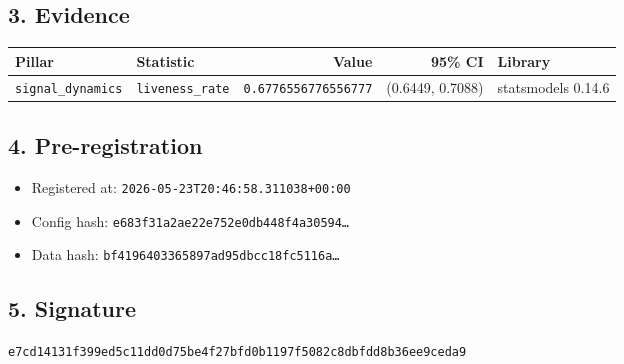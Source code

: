 \documentclass{article}
\begin{document}
\subsection*{3. Evidence}
\begin{tabular}{llrrl}\toprule
\textbf{Pillar} & \textbf{Statistic} & \textbf{Value} & \textbf{95\% CI} & \textbf{Library} \\\midrule
\texttt{signal\_dynamics} & \texttt{liveness\_rate} & \texttt{0.6776556776556777} & (0.6449, 0.7088) & statsmodels 0.14.6 \\
\bottomrule\end{tabular}
\subsection*{4. Pre-registration}
\begin{itemize}
\item Registered at: \texttt{2026-05-23T20:46:58.311038+00:00}
\item Config hash: \texttt{e683f31a2ae22e752e0db448f4a30594\dots}
\item Data hash: \texttt{bf4196403365897ad95dbcc18fc5116a\dots}
\end{itemize}
\subsection*{5. Signature}
\texttt{e7cd14131f399ed5c11dd0d75be4f27bfd0b1197f5082c8dbfdd8b36ee9ceda9}\\
\end{document}
